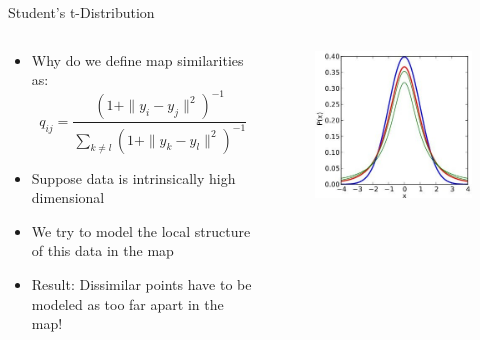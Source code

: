 \begin{frame}[allowframebreaks]{Student's t-Distribution}
    \begin{columns}
    \begin{column}{0.5\textwidth}
        \begin{itemize}
            \item Why do we define map similarities as:
            \begin{equation*}
                q_{ij} = \frac{(1 + \|y_i - y_j\|^2)^{-1}}{\sum_{k \neq l} (1 + \|y_k - y_l\|^2)^{-1}}
            \end{equation*}
            \item Suppose data is intrinsically high dimensional
            \item We try to model the local structure of this data in the map
            \item Result: Dissimilar points have to be modeled as too far apart in the map!
        \end{itemize}
    \end{column}
    \begin{column}{0.5\textwidth}
        \begin{figure}
            \centering
            \includegraphics[width=1\textwidth,keepaspectratio]{images/dul/dim-reduce/stundets-t-distrubution.jpg}
        \end{figure}
    \end{column}
    \end{columns}
\end{frame}

